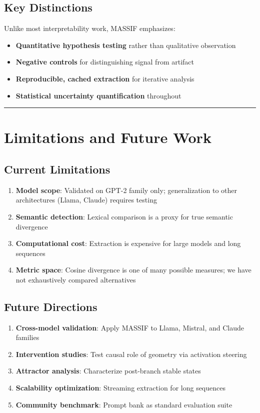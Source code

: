 \documentclass[12pt,a4paper]{article}
\begin{document}
\subsection{Key Distinctions}

Unlike most interpretability work, MASSIF emphasizes:
\begin{itemize}
    \item \textbf{Quantitative hypothesis testing} rather than qualitative observation
    \item \textbf{Negative controls} for distinguishing signal from artifact
    \item \textbf{Reproducible, cached extraction} for iterative analysis
    \item \textbf{Statistical uncertainty quantification} throughout
\end{itemize}

\medskip
\hrule
\medskip

\section{Limitations and Future Work}

\subsection{Current Limitations}

\begin{enumerate}
    \item \textbf{Model scope}: Validated on GPT-2 family only; generalization to other architectures (Llama, Claude) requires testing
    \item \textbf{Semantic detection}: Lexical comparison is a proxy for true semantic divergence
    \item \textbf{Computational cost}: Extraction is expensive for large models and long sequences
    \item \textbf{Metric space}: Cosine divergence is one of many possible measures; we have not exhaustively compared alternatives
\end{enumerate}

\subsection{Future Directions}

\begin{enumerate}
    \item \textbf{Cross-model validation}: Apply MASSIF to Llama, Mistral, and Claude families
    \item \textbf{Intervention studies}: Test causal role of geometry via activation steering
    \item \textbf{Attractor analysis}: Characterize post-branch stable states
    \item \textbf{Scalability optimization}: Streaming extraction for long sequences
    \item \textbf{Community benchmark}: Prompt bank as standard evaluation suite
\end{enumerate}
\end{document}
